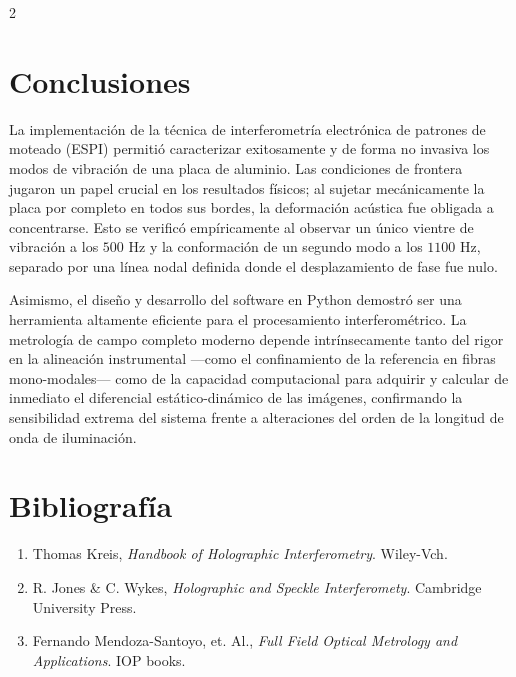 \documentclass[letterpaper]{article}
\begin{document}
\begin{multicols}{2}
		\section*{Conclusiones}
		La implementación de la técnica de interferometría electrónica de patrones de moteado (ESPI) permitió caracterizar exitosamente y de forma no invasiva los modos de vibración de una placa de aluminio. Las condiciones de frontera jugaron un papel crucial en los resultados físicos; al sujetar mecánicamente la placa por completo en todos sus bordes, la deformación acústica fue obligada a concentrarse. Esto se verificó empíricamente al observar un único vientre de vibración a los $500\text{ Hz}$ y la conformación de un segundo modo a los $1100\text{ Hz}$, separado por una línea nodal definida donde el desplazamiento de fase fue nulo.
		
		Asimismo, el diseño y desarrollo del software en Python demostró ser una herramienta altamente eficiente para el procesamiento interferométrico. La metrología de campo completo moderno depende intrínsecamente tanto del rigor en la alineación instrumental —como el confinamiento de la referencia en fibras mono-modales— como de la capacidad computacional para adquirir y calcular de inmediato el diferencial estático-dinámico de las imágenes, confirmando la sensibilidad extrema del sistema frente a alteraciones del orden de la longitud de onda de iluminación.
		
		\section*{Bibliografía}
		\begin{enumerate}
			\item Thomas Kreis, \textit{Handbook of Holographic Interferometry}. Wiley-Vch.
			\item R. Jones \& C. Wykes, \textit{Holographic and Speckle Interferomety}. Cambridge University Press.
			\item Fernando Mendoza-Santoyo, et. Al., \textit{Full Field Optical Metrology and Applications}. IOP books.
		\end{enumerate}
		
	\end{multicols}
\end{document}
